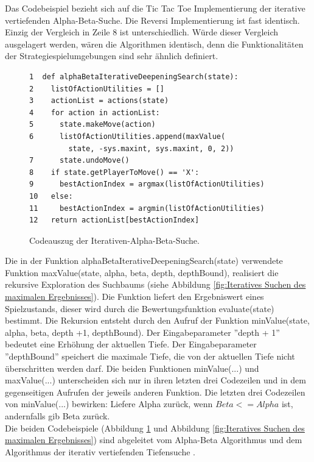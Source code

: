 Das Codebeispiel bezieht sich auf die Tic Tac Toe Implementierung der iterative vertiefenden Alpha-Beta-Suche. Die Reversi Implementierung ist fast identisch. Einzig der Vergleich in Zeile 8 ist unterschiedlich. Würde dieser Vergleich ausgelagert werden, wären die Algorithmen identisch, denn die Funktionalitäten der Strategiespielumgebungen sind sehr ähnlich definiert. \\

\begin{figure}[!htbp]
\centering
\begin{lstlisting}[frame=single, mathescape=true]
1  def alphaBetaIterativeDeepeningSearch(state):
2    listOfActionUtilities = []
3    actionList = actions(state)
4    for action in actionList:
5      state.makeMove(action)
6      listOfActionUtilities.append(maxValue(
         state, -sys.maxint, sys.maxint, 0, 2))
7      state.undoMove()
8    if state.getPlayerToMove() == 'X':
9      bestActionIndex = argmax(listOfActionUtilities)
10   else:
11     bestActionIndex = argmin(listOfActionUtilities)
12   return actionList[bestActionIndex]
\end{lstlisting}
\caption{Codeauszug der Iterativen-Alpha-Beta-Suche.}
\label{fig:Alpha-Beta iterativ vertiefende Suche}
\end{figure} 

Die in der Funktion alphaBetaIterativeDeepeningSearch(state) verwendete Funktion maxValue(state, alpha, beta, depth, depthBound), realisiert die rekursive Exploration des Suchbaums (siehe Abbildung \ref{fig:Iteratives Suchen des maximalen Ergebnisses}). Die Funktion liefert den Ergebniswert eines Spielzustands, dieser wird durch die Bewertungsfunktion evaluate(state) bestimmt. Die Rekursion entsteht durch den Aufruf der Funktion minValue(state, alpha, beta, depth +1, depthBound). Der Eingabeparameter ''depth + 1'' bedeutet eine Erhöhung der aktuellen Tiefe. Der Eingabeparameter ''depthBound'' speichert die maximale Tiefe, die von der aktuellen Tiefe nicht überschritten werden darf. Die beiden Funktionen minValue(...) und maxValue(...) unterscheiden sich nur in ihren letzten drei Codezeilen und in dem gegenseitigen Aufrufen der jeweils anderen Funktion. Die letzten drei Codezeilen von minValue(...) bewirken: Liefere Alpha zurück, wenn $Beta <= Alpha$ ist, andernfalls gib Beta zurück. \\

Die beiden Codebeispiele (Abbildung \ref{fig:Alpha-Beta iterativ vertiefende Suche} und Abbildung \ref{fig:Iteratives Suchen des maximalen Ergebnisses}) sind abgeleitet vom Alpha-Beta Algorithmus \cite[214 \psq]{Russell} und dem Algorithmus der iterativ vertiefenden Tiefensuche \cite[124]{Russell}.\\

